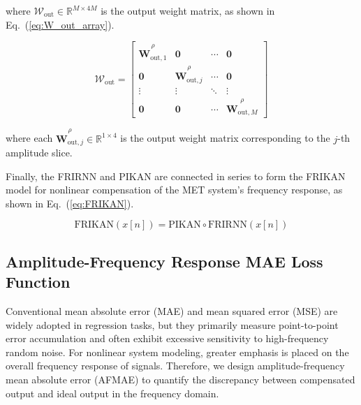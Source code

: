 \documentclass[journal]{IEEEtran}
\newcommand{\midx}{j} %
\newcommand{\mmax}{M} %
\newcommand{\relative}[1]{\overset{\rho}{#1}} %
\newcommand{\Woutarray}{\mathcal{W}_{\text{out}}}
\begin{document}
          where $\Woutarray \in \mathbb{R}^{\mmax \times 4\mmax}$ is the output weight matrix, as shown in Eq.~(\ref{eq:W_out_array}).

          \begin{equation}
              \Woutarray = \begin{bmatrix}
                  \relative{\mathbf{W}_{\text{out},1}} & \mathbf{0}                               & \cdots & \mathbf{0}                               \\
                  \mathbf{0}                           & \relative{\mathbf{W}_{\text{out},\midx}} & \cdots & \mathbf{0}                               \\
                  \vdots                               & \vdots                                   & \ddots & \vdots                                   \\
                  \mathbf{0}                           & \mathbf{0}                               & \cdots & \relative{\mathbf{W}_{\text{out},\mmax}}
              \end{bmatrix}
              \label{eq:W_out_array}
          \end{equation}


          
          where each $\relative{\mathbf{W}_{\text{out},j}} \in \mathbb{R}^{1 \times 4}$ is the output weight matrix corresponding to the $j$-th amplitude slice.




    Finally, the FRIRNN and PIKAN are connected in series to form the FRIKAN model for nonlinear compensation of the MET system's frequency response, as shown in Eq.~(\ref{eq:FRIKAN}).


\begin{equation}
    \text{FRIKAN}(x[n]) = \text{PIKAN} \circ \text{FRIRNN}(x[n])
    \label{eq:FRIKAN}
\end{equation}

\subsection{Amplitude-Frequency Response MAE Loss Function}

Conventional mean absolute error (MAE) and mean squared error (MSE) are widely adopted in regression tasks, but they primarily measure point-to-point error accumulation and often exhibit excessive sensitivity to high-frequency random noise. For nonlinear system modeling, greater emphasis is placed on the overall frequency response of signals. Therefore, we design amplitude-frequency mean absolute error (AFMAE) to quantify the discrepancy between compensated output and ideal output in the frequency domain.
\end{document}
